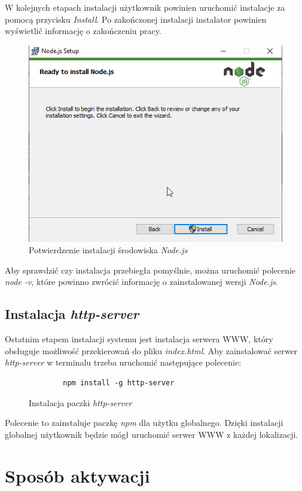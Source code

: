 \documentclass[a4paper,twoside,12pt]{book}
\begin{document}
W kolejnych etapach instalacji użytkownik powinien uruchomić instalacje za pomocą przycisku \textit{Install}. Po zakończonej instalacji instalator powinien wyświetlić informację o zakończeniu pracy.
\begin{figure}[H]
	\centering
	\includegraphics[width=0.7\linewidth]{../zrzuty_ekranu/instalacja_nodejs/node6}
	\caption{Potwierdzenie instalacji środowiska \textit{Node.js}}
	\label{fig:node6}
\end{figure}

Aby sprawdzić czy instalacja przebiegła pomyślnie, można uruchomić polecenie \textit{node -v}, które powinno zwrócić informację o zainstalowanej wersji \textit{Node.js}.

\subsection {Instalacja \textit{http-server}}
Ostatnim etapem instalacji systemu jest instalacja serwera WWW, który obsługuje możliwość przekierowań do pliku \textit{index.html}. Aby zainstalować serwer \textit{http-server} w terminalu trzeba uruchomić następujące polecenie:
\begin{figure} [H]
	\centering
	\begin{lstlisting}
		npm install -g http-server
	\end{lstlisting}
	\caption{Instalacja paczki \textit{http-server}}
	\label{fig:httpServerInstall}
\end{figure}

Polecenie to zainstaluje paczkę \textit{npm} dla użytku globalnego. Dzięki instalacji globalnej użytkownik będzie mógł uruchomić serwer WWW z każdej lokalizacji.

\section {Sposób aktywacji}
\end{document}

